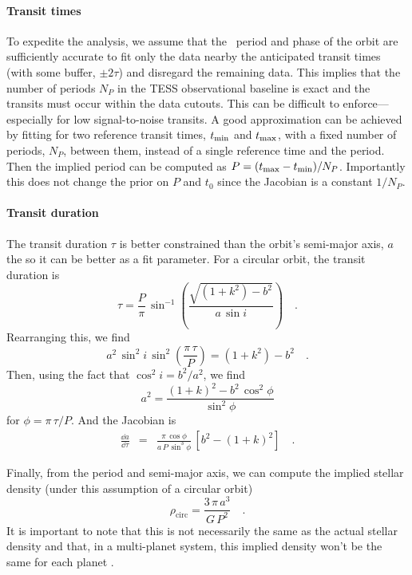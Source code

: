 \documentclass[floatfix,ApJL,twocolumn]{aastex631}
\begin{document}
\paragraph{Transit times}
To expedite the analysis, we assume that the \exofop\ period and phase of the orbit are sufficiently accurate to fit only the data nearby the anticipated transit times (with some buffer, $\pm2\tau$) and disregard the remaining data.
This implies that the number of periods $N_P$ in the TESS observational baseline is exact and the transits must occur within the data cutouts.
This can be difficult to enforce---especially for low signal-to-noise transits.
A good approximation can be achieved by fitting for two reference transit times, $t_{\rm min}$ and $t_{\rm max}$, with a fixed number of periods, $N_P$, between them, instead of a single reference time and the period.
Then the implied period can be computed as $P = (t_{\rm max} - t_{\rm min}) / N_P$.
Importantly this does not change the prior on $P$ and $t_0$ since the Jacobian is a constant $1/N_P$.


\paragraph{Transit duration}
The transit duration $\tau$ is better constrained than the orbit's semi-major axis, $a$ the so it can be better as a fit parameter.
For a circular orbit, the transit duration is \citep{Winn:2010}
\begin{equation}
  \tau = \frac{P}{\pi}\,\sin^{-1}\left( \frac{\sqrt{(1 + k^2) - b^2}}{a\,\sin i} \right) \quad.
\end{equation}
Rearranging this, we find
\begin{equation}
  a^2\,\sin^2 i\,\sin^2\left(\frac{\pi\,\tau}{P}\right) = (1 + k^2) - b^2 \quad.
\end{equation}
Then, using the fact that $\cos^2 i = b^2 / a^2$, we find
\begin{equation}
  a^2 = \frac{(1 + k)^2 - b^2\,\cos^2\phi}{\sin^2\phi}
\end{equation}
for $\phi = \pi\,\tau / P$.
And the Jacobian is
\begin{eqnarray}
  \frac{\dd a}{\dd \tau} &=& \frac{\pi\,\cos \phi}{a\,P\,\sin^3 \phi}\,\left[b^2 - (1 + k)^2\right] \quad.
\end{eqnarray}

Finally, from the period and semi-major axis, we can compute the implied stellar density (under this assumption of a circular orbit)
\begin{equation}
  \rho_\mathrm{circ} = \frac{3\,\pi\,a^3}{G\,P^2} \quad.
\end{equation}
It is important to note that this is not necessarily the same as the actual stellar density and that, in a multi-planet system, this implied density won't be the same for each planet \citep[see, for example,][]{Dawson:2012, Kipping:2012}.
\end{document}
